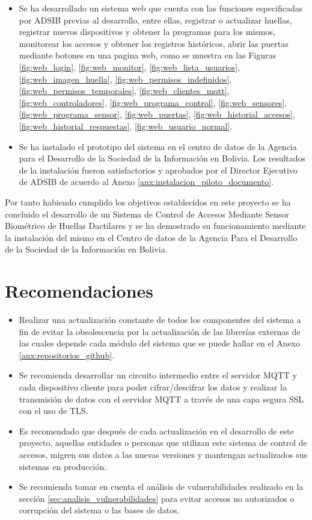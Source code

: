 \documentclass[../principal]{subfiles}
\begin{document}
\begin{itemize}
    \item Se ha desarrollado un sistema web que cuenta con las funciones especificadas por ADSIB previas al desarrollo, entre ellas, registrar o actualizar huellas, registrar nuevos dispositivos y obtener la programas para los mismos, monitorear los accesos y obtener los registros históricos, abrir las puertas mediante botones en una pagina web, como se muestra en las Figuras \ref{fig:web_login}, \ref{fig:web_monitor}, \ref{fig:web_lista_usuarios}, \ref{fig:web_imagen_huella}, \ref{fig:web_permisos_indefinidos}, \ref{fig:web_permisos_temporales}, \ref{fig:web_clientes_mqtt}, \ref{fig:web_controladores}, \ref{fig:web_programa_control}, \ref{fig:web_sensores}, \ref{fig:web_programa_sensor}, \ref{fig:web_puertas}, \ref{fig:web_historial_accesos}, \ref{fig:web_historial_respuestas}, \ref{fig:web_usuario_normal}.
    \item Se ha instalado el prototipo del sistema en el centro de datos de la Agencia para el Desarrollo de la Sociedad de la Información en Bolivia. Los resultados de la instalación fueron satisfactorios y aprobados por el Director Ejecutivo de ADSIB de acuerdo al Anexo \ref{anx:instalacion_piloto_documento}.
  \end{itemize}

  Por tanto habiendo cumplido los objetivos establecidos en este proyecto se ha concluido el desarrollo de un Sistema de Control de Accesos Mediante Sensor Biométrico de Huellas Dactilares y se ha demostrado su funcionamiento mediante la instalación del mismo en el Centro de datos de la Agencia Para el Desarrollo de la Sociedad de la Información en Bolivia.

  \section{Recomendaciones}

  \begin{itemize}
    \item Realizar una actualización constante de todos los componentes del sistema a fin de evitar la obsolescencia por la actualización de las librerías externas de las cuales depende cada módulo del sistema que se puede hallar en el Anexo \ref{anx:repositorios_github}.
    \item Se recomienda desarrollar un circuito intermedio entre el servidor MQTT y cada dispositivo cliente para poder cifrar/descifrar los datos y realizar la transmisión de datos con el servidor MQTT a través de una capa segura SSL con el uso de TLS.
    \item Es recomendado que después de cada actualización en el desarrollo de este proyecto, aquellas entidades o personas que utilizan este sistema de control de accesos, migren sus datos a las nuevas versiones y mantengan actualizados sus sistemas en producción.
    \item Se recomienda tomar en cuenta el análisis de vulnerabilidades realizado en la sección \ref{sec:analisis_vulnerabilidades} para evitar accesos no autorizados o corrupción del sistema o las bases de datos.
  \end{itemize}
\end{document}
